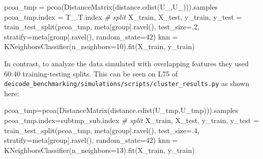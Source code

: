 \documentclass[
]{article}
\newenvironment{Shaded}{}{}
\newcommand{\CommentTok}[1]{\textcolor[rgb]{0.63,0.63,0.65}{\textit{#1}}}
\newcommand{\DecValTok}[1]{\textcolor[rgb]{0.60,0.41,0.00}{#1}}
\newcommand{\FloatTok}[1]{\textcolor[rgb]{0.60,0.41,0.00}{#1}}
\newcommand{\NormalTok}[1]{\textcolor[rgb]{0.22,0.23,0.26}{#1}}
\newcommand{\OperatorTok}[1]{\textcolor[rgb]{0.65,0.15,0.64}{#1}}
\newcommand{\StringTok}[1]{\textcolor[rgb]{0.31,0.63,0.31}{#1}}
\begin{document}
\footnotesize

\begin{Shaded}
\begin{Highlighting}[numbers=left,,firstnumber=3,]
\NormalTok{pcoa\_tmp }\OperatorTok{=}\NormalTok{ pcoa(DistanceMatrix(distance.cdist(U\_,U\_))).samples}
\NormalTok{pcoa\_tmp.index }\OperatorTok{=}\NormalTok{ T\_.T.index}
\CommentTok{\# split}
\NormalTok{X\_train, X\_test, y\_train, y\_test }\OperatorTok{=}\NormalTok{ train\_test\_split(pcoa\_tmp, meta[}\StringTok{\textquotesingle{}group\textquotesingle{}}\NormalTok{].ravel(), }
\NormalTok{                                                    test\_size}\OperatorTok{=}\FloatTok{.2}\NormalTok{, }
\NormalTok{                                                    stratify}\OperatorTok{=}\NormalTok{meta[}\StringTok{\textquotesingle{}group\textquotesingle{}}\NormalTok{].ravel(), }
\NormalTok{                                                    random\_state}\OperatorTok{=}\DecValTok{42}\NormalTok{)}
\NormalTok{knn }\OperatorTok{=}\NormalTok{ KNeighborsClassifier(n\_neighbors}\OperatorTok{=}\DecValTok{10}\NormalTok{).fit(X\_train, y\_train)}
\end{Highlighting}
\end{Shaded}

\normalsize{}

In contrast, to analyze the data simulated with overlapping features
they used 60:40 training-testing splits. This can be seen on L75 of
\texttt{deicode\_benchmarking/simulations/scripts/cluster\_results.py}
as shown here:

\footnotesize

\begin{Shaded}
\begin{Highlighting}[numbers=left,,firstnumber=71,]
\NormalTok{pcoa\_tmp}\OperatorTok{=}\NormalTok{pcoa(DistanceMatrix(distance.cdist(U\_tmp,U\_tmp))).samples}
\NormalTok{pcoa\_tmp.index}\OperatorTok{=}\NormalTok{subtmp\_sub.index}
\CommentTok{\# split}
\NormalTok{X\_train, X\_test, y\_train, y\_test }\OperatorTok{=}\NormalTok{ train\_test\_split(pcoa\_tmp, meta[}\StringTok{\textquotesingle{}group\textquotesingle{}}\NormalTok{].ravel(), }
\NormalTok{                                                    test\_size}\OperatorTok{=}\FloatTok{.4}\NormalTok{, }
\NormalTok{                                                    stratify}\OperatorTok{=}\NormalTok{meta[}\StringTok{\textquotesingle{}group\textquotesingle{}}\NormalTok{].ravel(), }
\NormalTok{                                                    random\_state}\OperatorTok{=}\DecValTok{42}\NormalTok{)}
\NormalTok{knn }\OperatorTok{=}\NormalTok{ KNeighborsClassifier(n\_neighbors}\OperatorTok{=}\DecValTok{13}\NormalTok{).fit(X\_train, y\_train)}
\end{Highlighting}
\end{Shaded}
\end{document}
